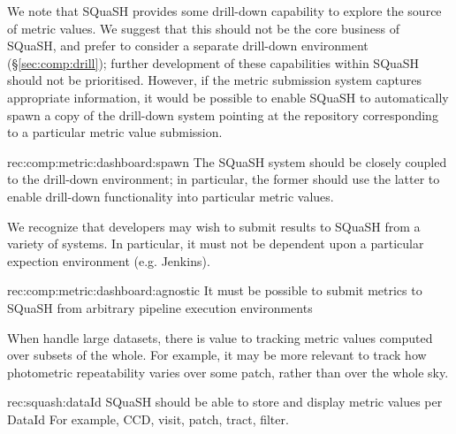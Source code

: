 We note that SQuaSH provides some drill-down capability to explore the source of metric values.
We suggest that this should not be the core business of SQuaSH, and prefer to consider a separate drill-down environment (\S\ref{sec:comp:drill}); further development of these capabilities within SQuaSH should not be prioritised.
However, if the metric submission system captures appropriate information, it would be possible to enable SQuaSH to automatically spawn a copy of the drill-down system pointing at the repository corresponding to a particular metric value submission.

\begin{recommendation}
  {rec:comp:metric:dashboard:spawn}
  {The SQuaSH system should be closely coupled to the drill-down environment; in particular, the former should use the latter to enable drill-down functionality into particular metric values.}
\end{recommendation}

We recognize that developers may wish to submit results to SQuaSH from a variety of systems.
In particular, it must not be dependent upon a particular expection environment (e.g. Jenkins).

\begin{recommendation}
    {rec:comp:metric:dashboard:agnostic}
    {It must be possible to submit metrics to SQuaSH from arbitrary pipeline execution environments}
\end{recommendation}

When handle large datasets, there is value to tracking metric values computed over subsets of the whole.
For example, it may be more relevant to track how photometric repeatability varies over some patch, rather than over the whole sky.

\begin{recommendation}
    {rec:squash:dataId}
    {SQuaSH should be able to store and display metric values per DataId}
    For example, CCD, visit, patch, tract, filter.
\end{recommendation}
